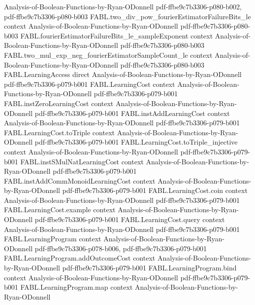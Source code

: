 \begin{theorem}
  {Analysis-of-Boolean-Functions-by-Ryan-ODonnell}
  {pdf-ffbe9c7b3306-p080-b002,
    pdf-ffbe9c7b3306-p080-b003}
\proofstep
  {FABL.two_div_pow_fourierEstimatorFailureBits_le}
  {context}
  {Analysis-of-Boolean-Functions-by-Ryan-ODonnell}
  {pdf-ffbe9c7b3306-p080-b003}
\proofstep
  {FABL.fourierEstimatorFailureBits_le_sampleExponent}
  {context}
  {Analysis-of-Boolean-Functions-by-Ryan-ODonnell}
  {pdf-ffbe9c7b3306-p080-b003}
\proofstep
  {FABL.two_mul_exp_neg_fourierEstimatorSampleCount_le}
  {context}
  {Analysis-of-Boolean-Functions-by-Ryan-ODonnell}
  {pdf-ffbe9c7b3306-p080-b003}
\proofstep
  {FABL.LearningAccess}
  {direct}
  {Analysis-of-Boolean-Functions-by-Ryan-ODonnell}
  {pdf-ffbe9c7b3306-p079-b001}
\proofstep
  {FABL.LearningCost}
  {context}
  {Analysis-of-Boolean-Functions-by-Ryan-ODonnell}
  {pdf-ffbe9c7b3306-p079-b001}
\proofstep
  {FABL.instZeroLearningCost}
  {context}
  {Analysis-of-Boolean-Functions-by-Ryan-ODonnell}
  {pdf-ffbe9c7b3306-p079-b001}
\proofstep
  {FABL.instAddLearningCost}
  {context}
  {Analysis-of-Boolean-Functions-by-Ryan-ODonnell}
  {pdf-ffbe9c7b3306-p079-b001}
\proofstep
  {FABL.LearningCost.toTriple}
  {context}
  {Analysis-of-Boolean-Functions-by-Ryan-ODonnell}
  {pdf-ffbe9c7b3306-p079-b001}
\proofstep
  {FABL.LearningCost.toTriple_injective}
  {context}
  {Analysis-of-Boolean-Functions-by-Ryan-ODonnell}
  {pdf-ffbe9c7b3306-p079-b001}
\proofstep
  {FABL.instSMulNatLearningCost}
  {context}
  {Analysis-of-Boolean-Functions-by-Ryan-ODonnell}
  {pdf-ffbe9c7b3306-p079-b001}
\proofstep
  {FABL.instAddCommMonoidLearningCost}
  {context}
  {Analysis-of-Boolean-Functions-by-Ryan-ODonnell}
  {pdf-ffbe9c7b3306-p079-b001}
\proofstep
  {FABL.LearningCost.coin}
  {context}
  {Analysis-of-Boolean-Functions-by-Ryan-ODonnell}
  {pdf-ffbe9c7b3306-p079-b001}
\proofstep
  {FABL.LearningCost.example}
  {context}
  {Analysis-of-Boolean-Functions-by-Ryan-ODonnell}
  {pdf-ffbe9c7b3306-p079-b001}
\proofstep
  {FABL.LearningCost.query}
  {context}
  {Analysis-of-Boolean-Functions-by-Ryan-ODonnell}
  {pdf-ffbe9c7b3306-p079-b001}
\proofstep
  {FABL.LearningProgram}
  {context}
  {Analysis-of-Boolean-Functions-by-Ryan-ODonnell}
  {pdf-ffbe9c7b3306-p078-b006,
    pdf-ffbe9c7b3306-p079-b001}
\proofstep
  {FABL.LearningProgram.addOutcomeCost}
  {context}
  {Analysis-of-Boolean-Functions-by-Ryan-ODonnell}
  {pdf-ffbe9c7b3306-p079-b001}
\proofstep
  {FABL.LearningProgram.bind}
  {context}
  {Analysis-of-Boolean-Functions-by-Ryan-ODonnell}
  {pdf-ffbe9c7b3306-p079-b001}
\proofstep
  {FABL.LearningProgram.map}
  {context}
  {Analysis-of-Boolean-Functions-by-Ryan-ODonnell}

\end{theorem}
